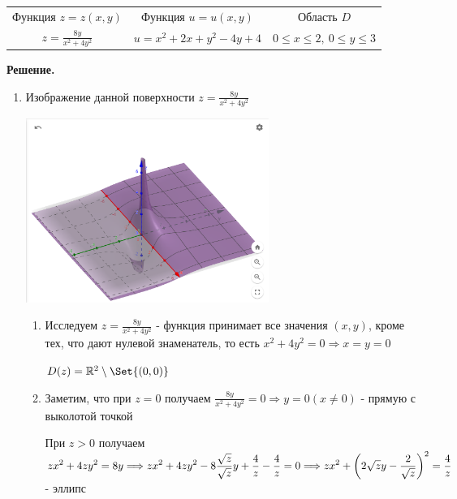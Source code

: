 \begin{enumerate}[label=\Alph*.]
    \vspace{5mm}

    \begin{tabular}{ccc}
        Функция $z = z(x, y)$                     & Функция $u = u(x, y)$         & Область $D$                          \\
        $\displaystyle z = \frac{8y}{x^2 + 4y^2}$ & $u = x^2 + 2x + y^2 - 4y + 4$ & $0 \leq x \leq 2, \ 0 \leq y \leq 3$
    \end{tabular}
\end{enumerate}

\vspace{10mm}
\textbf{Решение.}

\begin{enumerate}[label=\Alph*.]
    \item Изображение данной поверхности $\displaystyle z = \frac{8y}{x^2 + 4y^2}$

    \includegraphics[height=60mm]{images/2a1}

    \begin{enumerate}[label=\arabic*.]
        \item Исследуем $\displaystyle z = \frac{8y}{x^2 + 4y^2}$ - функция принимает все значения $(x, y)$, кроме тех,
        что дают нулевой знаменатель, то есть $x^2 + 4y^2 = 0 \Longrightarrow x = y = 0$

        $D(z) = \Real^2 \setminus \Set{(0, 0)}$

        \item Заметим, что при $z = 0$ получаем $\displaystyle \frac{8y}{x^2 + 4y^2} = 0 \Longrightarrow y = 0 (x \neq 0)$ - прямую с выколотой точкой

        При $z > 0$ получаем $\displaystyle zx^2 + 4zy^2 = 8y \Longrightarrow
        zx^2 + 4zy^2 - 8\frac{\sqrt{z}}{\sqrt{z}}y + \frac{4}{z} - \frac{4}{z} = 0 \Longrightarrow \\
        zx^2 + \left(2\sqrt{z}y - \frac{2}{\sqrt{z}}\right)^2 = \frac{4}{z}$ - эллипс


\end{enumerate}
\end{enumerate}
